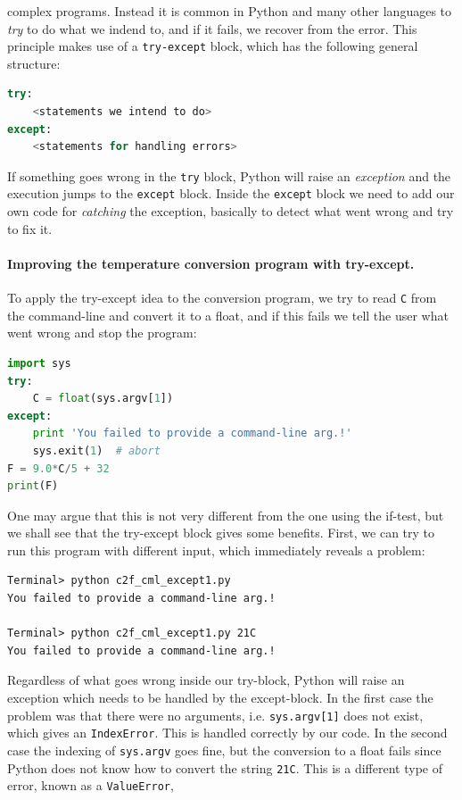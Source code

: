 \documentclass[graybox,envcountchap,sectrefs,final]{svmonodo}
\begin{document}
complex programs. Instead it is common in Python and many other languages to \emph{try} to do what we indend to,
and if it fails, we recover from the error. This principle makes use of a \texttt{try-except} block, which has the following general
structure:
\begin{lstlisting}[language=Python,style=blue1]
try:
    <statements we intend to do>
except:
    <statements for handling errors>
\end{lstlisting}
If something goes wrong in the \texttt{try} block, Python will raise an \emph{exception} and the execution jumps to the \texttt{except} block.
Inside the \texttt{except} block we need to add our own code for \emph{catching} the exception, basically to detect what went wrong and
try to fix it.

\paragraph{Improving the temperature conversion program with try-except.}
To apply the try-except idea to the conversion program, we try to read \texttt{C} from the command-line and convert it to a float,
and if this fails we tell the user what went wrong and stop the program:
\begin{lstlisting}[language=Python,style=blue1]
import sys
try:
    C = float(sys.argv[1])
except:
    print 'You failed to provide a command-line arg.!'
    sys.exit(1)  # abort
F = 9.0*C/5 + 32
print(F)
\end{lstlisting}
One may argue that this is not very different from the one using the if-test, but we shall see that the try-except block gives
some benefits. First, we can try to run this program with different input, which immediately reveals a problem:
\begin{Verbatim}[frame=lines,label=\fbox{{\tiny Terminal}},framesep=2.5mm,framerule=0.7pt]
Terminal> python c2f_cml_except1.py
You failed to provide a command-line arg.!

Terminal> python c2f_cml_except1.py 21C
You failed to provide a command-line arg.!
\end{Verbatim}
Regardless of what goes wrong inside our try-block, Python will raise an exception which needs to be handled by the except-block.
In the first case the problem was that there were no arguments, i.e. \texttt{sys.argv[1]} does not exist, which gives an \texttt{IndexError}.
This is handled correctly by our code. In the second case the indexing of \texttt{sys.argv} goes fine, but the conversion to a float
fails since Python does not know how to convert the string \texttt{21C}. This is a different type of error, known as a \texttt{ValueError},
\end{document}

